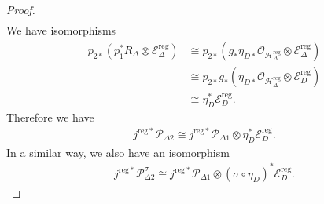 \documentclass[11pt,oneside,a4paper,mathscr]{amsart}
\theoremstyle{definition}
\newcommand{\cH}{\mathcal{H}}
\newcommand{\cP}{\mathcal{P}}
\newcommand{\cE}{\mathcal{E}}
\begin{document}
\begin{proof}
\begin{align}
\end{align}
We have isomorphisms 
\begin{align*}
    p_{2*}(p_1^* R_{\Delta}\otimes \cE^{\mathrm{reg}}_{\Delta})&\cong 
    p_{2*}(g_{*}\eta_{D*}\mathcal{O}_{\cH_{\Delta}^{\mathrm{reg}}}\otimes \cE^{\mathrm{reg}}_{\Delta}) \\
    &\cong p_{2*}g_{*}(\eta_{D*}\mathcal{O}_{\cH_{\Delta}^{\mathrm{reg}}}\otimes \cE^{\mathrm{reg}}_{D}) \\
    &\cong \eta_D^* \cE^{\mathrm{reg}}_{D}.
\end{align*}
Therefore we have 
\begin{align}\label{isom:P}
      j^{\mathrm{reg}*}\cP_{\Delta 2} \cong j^{\mathrm{reg}*}\mathcal{P}_{\Delta 1} \otimes \eta_D^* \cE^{\mathrm{reg}}_{D}.
\end{align}
In a similar way, we also have an isomorphism 
\begin{align}\label{isom:P2}
      j^{\mathrm{reg}*}\cP_{\Delta 2}^{\sigma} \cong j^{\mathrm{reg}*}\mathcal{P}_{\Delta 1} \otimes (\sigma \circ \eta_D)^* \cE^{\mathrm{reg}}_{D}.
\end{align}


\end{proof}
\end{document}
